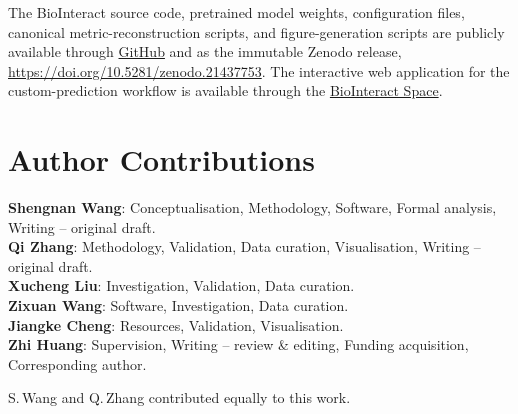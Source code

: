 \documentclass[fleqn,10pt]{wlscirep}
\begin{document}
The BioInteract source code, pretrained model weights, configuration files,
canonical metric-reconstruction scripts, and figure-generation scripts are
publicly available through \href{https://github.com/Liubo-520/bio-intelligence}{GitHub} and
as the immutable Zenodo release, \url{https://doi.org/10.5281/zenodo.21437753}.
The interactive web
application for the custom-prediction workflow is available through the
\href{https://huggingface.co/spaces/AI4deeperScience/BioInteract}{BioInteract Space}.
\endgroup

\section*{Author Contributions}

\textbf{Shengnan Wang}: Conceptualisation, Methodology, Software, Formal
analysis, Writing -- original draft. \\
\textbf{Qi Zhang}: Methodology, Validation, Data curation, Visualisation,
Writing -- original draft. \\
\textbf{Xucheng Liu}: Investigation, Validation, Data curation. \\
\textbf{Zixuan Wang}: Software, Investigation, Data curation. \\
\textbf{Jiangke Cheng}: Resources, Validation, Visualisation. \\
\textbf{Zhi Huang}: Supervision, Writing -- review \& editing, Funding
acquisition, Corresponding author.

\vspace{0.5em}
\noindent S.\,Wang and Q.\,Zhang contributed equally to this work.

\end{document}
